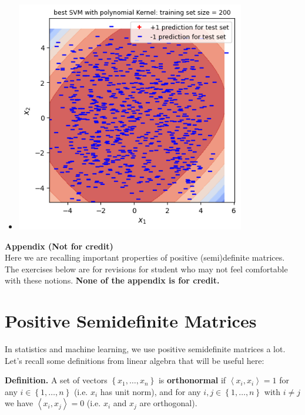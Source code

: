 \documentclass{article}
\theoremstyle{plain}
\theoremstyle{definition}
\begin{document}
\begin{enumerate}
\begin{itemize}
    \item \includegraphics[width=10cm]{homework/homework_3/immages/question_35_3.png}
\end{itemize}



\setcounter{saveenum}{\value{enumi}}
\end{enumerate}

\newpage

\appendix
{ \huge \bf Appendix (Not for credit)} \\[.2cm]

Here we are recalling important properties of positive (semi)definite matrices. 
The exercises below are for revisions for student who may not feel comfortable with these notions.  \textbf{None of the appendix is for credit. }

\section{Positive Semidefinite Matrices}

In statistics and machine learning, we use positive semidefinite matrices
a lot. Let's recall some definitions from linear algebra that will
be useful here:

{\bf Definition. }
A set of vectors $\left\{ x_{1},\ldots,x_{n}\right\} $ is \textbf{orthonormal}
if $\left\langle x_{i},x_{i}\right\rangle =1$ for any $i\in\left\{ 1,\ldots,n\right\} $
(i.e. $x_{i}$ has unit norm), and for any $i,j\in\left\{ 1,\ldots,n\right\} $
with $i\neq j$ we have $\left\langle x_{i},x_{j}\right\rangle =0$
(i.e. $x_{i}$ and $x_{j}$ are orthogonal).
\end{document}
